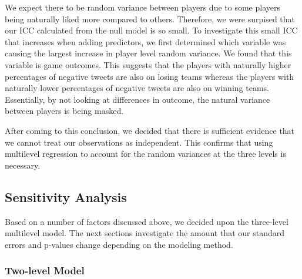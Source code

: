 \documentclass[12pt,twoside]{reedthesis}
\begin{document}
We expect there to be random variance between players due to some
players being naturally liked more compared to others. Therefore, we
were surpised that our ICC calculated from the null model is so small.
To investigate this small ICC that increases when adding predictors, we
first determined which variable was causing the largest increase in
player level random variance. We found that this variable is game
outcomes. This suggests that the players with naturally higher
percentages of negative tweets are also on losing teams whereas the
players with naturally lower percentages of negative tweets are also on
winning teams. Essentially, by not looking at differences in outcome,
the natural variance between players is being masked.

After coming to this conclusion, we decided that there is sufficient
evidence that we cannot treat our observations as independent. This
confirms that using multilevel regression to account for the random
variances at the three levels is necessary.

\subsection{Sensitivity Analysis}\label{sensitivity-analysis}

Based on a number of factors discussed above, we decided upon the
three-level multilevel model. The next sections investigate the amount
that our standard errors and p-values change depending on the modeling
method.

\subsubsection{Two-level Model}\label{two-level-model}
\end{document}
